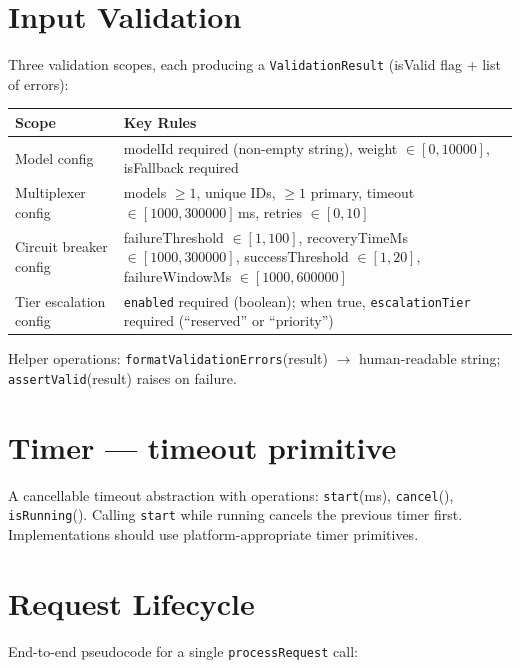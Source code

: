 \documentclass[10pt,letterpaper]{article}
\newcommand{\cls}[1]{\texttt{#1}}
\newcommand{\fn}[1]{\texttt{#1}}
\newcommand{\fld}[1]{\texttt{#1}}
\begin{document}
\section*{{\color{utilorange}Input Validation}}

Three validation scopes, each producing a \cls{ValidationResult} (isValid flag + list of errors):

\smallskip
\begin{tabular}{@{}l l@{}}
\toprule
\textbf{Scope} & \textbf{Key Rules} \\
\midrule
Model config & modelId required (non-empty string), weight $\in [0, 10000]$, isFallback required \\
Multiplexer config & models $\ge 1$, unique IDs, $\ge 1$ primary, timeout $\in [1000, 300000]$\,ms, retries $\in [0, 10]$ \\
Circuit breaker config & failureThreshold $\in [1, 100]$, recoveryTimeMs $\in [1000, 300000]$, successThreshold $\in [1, 20]$, failureWindowMs $\in [1000, 600000]$ \\
Tier escalation config & \fld{enabled} required (boolean); when true, \fld{escalationTier} required (``reserved'' or ``priority'') \\
\bottomrule
\end{tabular}

\medskip
\noindent Helper operations: \fn{formatValidationErrors}(result) $\to$ human-readable string; \fn{assertValid}(result) raises on failure.

\section*{{\color{utilorange}Timer} \normalfont\small--- timeout primitive}

A cancellable timeout abstraction with operations: \fn{start}(ms), \fn{cancel}(), \fn{isRunning}(). Calling \fn{start} while running cancels the previous timer first. Implementations should use platform-appropriate timer primitives.

\section*{Request Lifecycle}

End-to-end pseudocode for a single \fn{processRequest} call:
\end{document}
